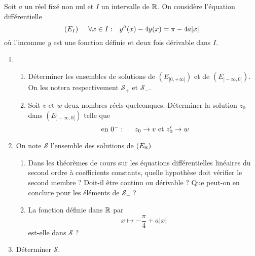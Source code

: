 Soit $a$ un r{\'e}el fix{\'e} non nul et $I$ un intervalle de $\mathbb{R}$. On consid{\`e}re l'{\'e}quation différentielle
\begin{equation*}
(E_I)\hspace{0.5cm}  \forall x \in I:\hspace{0.25cm} y''(x)-4y(x)=\pi-4a|x|
\end{equation*}
où l'inconnue $y$ est une fonction définie et deux fois dérivable dans $I$.
\begin{enumerate}
  \item
\begin{enumerate}
 \item  D{\'e}terminer les ensembles de solutions de $(E_{]0,+\infty[})$ et de $(E_{]-\infty,0[})$. On les notera respectivement $\mathcal{S}_+$ et $\mathcal{S}_-$.
 \item Soit $v$ et $w$ deux nombres réels quelconques. Déterminer la solution $z_0$ dans $(E_{]-\infty,0[})$ telle que 
\begin{displaymath}
 \text{ en }0^-:\hspace{0.5cm} z_0 \rightarrow v \text{ et } z_0' \rightarrow w 
\end{displaymath}

\end{enumerate}
  \item On note $\mathcal{S}$ l'ensemble des solutions de $(E_{\mathbb{R}})$ 
\begin{enumerate}
 \item Dans les théorèmes de cours sur les équations différentielles linéaires du second ordre à coefficients constants, quelle hypothèse doit vérifier le second membre ? Doit-il être continu ou dérivable ?\newline
 Que peut-on en conclure pour les éléments de  $\mathcal{S}_+$ ?
  \item La fonction définie dans $\mathbb{R}$ par
\begin{displaymath}
 x\mapsto -\frac{\pi}{4}+a|x|
\end{displaymath}
est-elle dans  $\mathcal{S}$ ?
\end{enumerate}

\item Déterminer  $\mathcal{S}$.
\end{enumerate}
